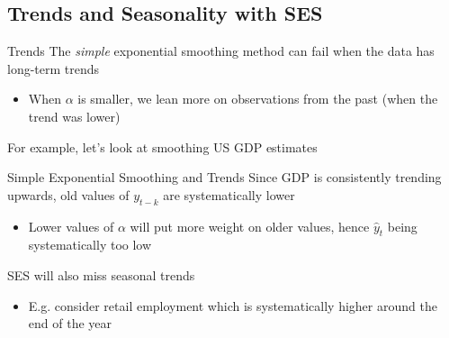 \documentclass[aspectratio=169,t,11pt,table]{beamer}
\begin{document}
\subsection{Trends and Seasonality with SES}

\begin{frame}{Trends}
  The \emph{simple} exponential smoothing method can fail when the data has long-term trends
  \begin{itemize}
    \item When $\alpha$ is smaller, we lean more on observations from the past (when the trend was lower)
  \end{itemize}

  \bigskip
  For example, let's look at smoothing US GDP estimates
\end{frame}


\begin{frame}{Simple Exponential Smoothing and Trends}
  Since GDP is consistently trending upwards, old values of $y_{t-k}$ are systematically lower
  \begin{itemize}
    \item Lower values of $\alpha$ will put more weight on older values, hence $\hat{y}_t$ being systematically too low
  \end{itemize}

  \bigskip
  SES will also miss seasonal trends
  \begin{itemize}
    \item E.g. consider retail employment which is systematically higher around the end of the year
  \end{itemize}
\end{frame}


% 
\end{document}
